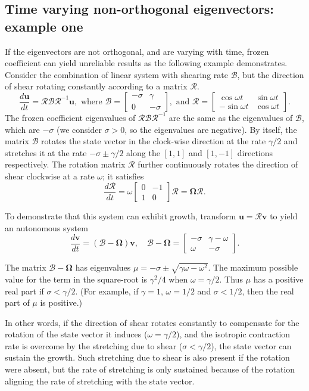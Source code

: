 \documentclass[letterpaper,10pt]{article}
\newcommand{\bu}{\boldsymbol{u}}
\newcommand{\bv}{\boldsymbol{v}}
\newcommand{\cB}{\boldsymbol{\mathcal{B}}}
\newcommand{\cR}{\boldsymbol{\mathcal{R}}}
\newcommand{\cOmega}{\boldsymbol{\boldsymbol{\Omega}}}
\newcommand{\Rot}{{
\begin{bmatrix} 
  \cos \omega t & \sin \omega t \\
 -\sin \omega t & \cos \omega t
\end{bmatrix}
}}
\newcommand{\Bmat}{{
\begin{bmatrix} 
 -\sigma & \gamma \\
 0  & -\sigma
\end{bmatrix}
}}
\begin{document}
\subsection*{Time varying non-orthogonal eigenvectors: example one}
If the eigenvectors are not orthogonal, and are varying with time, frozen coefficient can yield unreliable results as the following example demonstrates. Consider the combination of linear system with shearing rate $\cB$, but the direction of shear rotating constantly according to a matrix $\cR$.
\begin{equation}
 \frac{d\bu}{dt} = \cR \cB \cR^{-1} \bu, \text{ where } \cB = \Bmat, \text{ and } \cR = \Rot.
\end{equation}
The frozen coefficient eigenvalues of $\cR \cB \cR^{-1}$ are the same as the eigenvalues of $\cB$, which are $-\sigma$ (we consider $\sigma>0$, so the eigenvalues are negative). 
By itself, the matrix $\cB$ rotates the state vector in the clock-wise direction at the rate $\gamma/2$ and stretches it at the rate $-\sigma \pm \gamma/2$ along the $[1, 1]$ and $[1, -1]$ directions respectively. 
The rotation matrix $\cR$ further continuously rotates the direction of shear clockwise at a rate $\omega$; it satisfies
\begin{equation}
 \frac{d\cR}{dt} = \omega \begin{bmatrix} 0 & -1 \\ 1 & 0 \end{bmatrix} \cR = \cOmega \cR.
\end{equation}

To demonstrate that this system can exhibit growth, transform $\bu = \cR \bv$ to yield an autonomous system
\begin{equation}
 \frac{d\bv}{dt} = (\cB - \cOmega) \bv, \quad \cB - \cOmega = \begin{bmatrix} -\sigma & \gamma-\omega \\ \omega & -\sigma \end{bmatrix}.
\end{equation} 
          
The matrix $\cB - \cOmega$ has eigenvalues $\mu = -\sigma \pm \sqrt{\gamma \omega -\omega^2}$. The maximum possible value for the term in the square-root is $\gamma^2/4$ when $\omega = \gamma/2$. Thus $\mu$ has a positive real part if $\sigma < \gamma/2$. (For example, if $\gamma = 1$, $\omega = 1/2$ and $\sigma < 1/2$, then the real part of $\mu$ is positive.)  

In other words, if the direction of shear rotates constantly to compensate for the rotation of the state vector it induces ($\omega = \gamma/2$), and the isotropic contraction rate is overcome by the stretching due to shear ($\sigma<\gamma/2$), the state vector can sustain the growth. Such stretching due to shear is also present if the rotation were absent, but the rate of stretching is only sustained because of the rotation aligning the rate of stretching with the state vector. 
\end{document}
